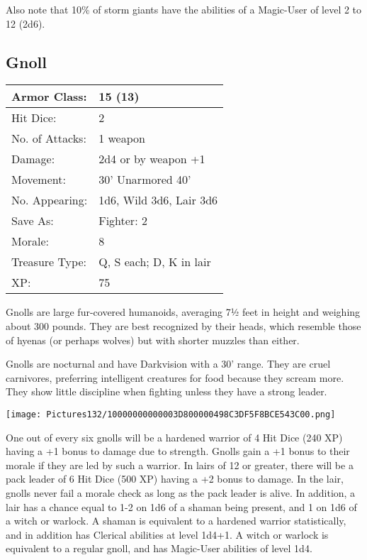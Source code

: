 \documentclass[a4paper,twoside,openany,10pt]{book}
\begin{document}
\begin{multicols}{2}
Also note that 10\% of storm giants have the abilities of a Magic-User of level 2 to 12 (2d6).


\subsection*{Gnoll}\label{gnoll}

\begin{tabularx}{0.48\textwidth}{@{}lX@{}}
Armor Class: & 15 (13) \\\hline
Hit Dice: & 2 \\\hline
No. of Attacks: & 1 weapon \\\hline
Damage: & 2d4 or by weapon +1 \\\hline
Movement: & 30' Unarmored 40' \\\hline
No. Appearing: & 1d6, Wild 3d6, Lair 3d6 \\\hline
Save As: & Fighter: 2 \\\hline
Morale: & 8 \\\hline
Treasure Type: & Q, S each; D, K in lair \\\hline
XP: & 75 \\\hline
\end{tabularx}\medskip

Gnolls are large fur-covered humanoids, averaging 7½ feet in height and weighing about 300 pounds. They are best recognized by their heads, which resemble those of hyenas (or perhaps wolves) but with shorter muzzles than either.

Gnolls are nocturnal and have Darkvision with a 30' range. They are cruel carnivores, preferring intelligent creatures for food because they scream more. They show little discipline when fighting unless they have a strong leader.


\begin{center}
	\texttt{[image: Pictures132/10000000000003D800000498C3DF5F8BCE543C00.png]}
\end{center}


One out of every six gnolls will be a hardened warrior of 4 Hit Dice (240 XP) having a +1 bonus to damage due to strength. Gnolls gain a +1 bonus to their morale if they are led by such a warrior. In lairs of 12 or greater, there will be a pack leader of 6 Hit Dice (500 XP) having a +2 bonus to damage. In the lair, gnolls never fail a morale check as long as the pack leader is alive. In addition, a lair has a chance equal to 1-2 on 1d6 of a shaman being present, and 1 on 1d6 of a witch or warlock. A shaman is equivalent to a hardened warrior statistically, and in addition has Clerical abilities at level 1d4+1. A witch or warlock is equivalent to a regular gnoll, and has Magic-User abilities of level 1d4.


\end{multicols}
\end{document}
